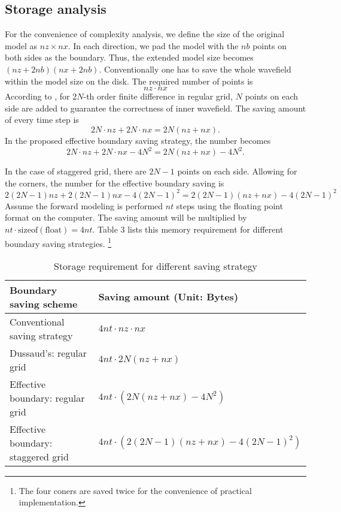\subsection{Storage analysis}

For the convenience of complexity analysis, we define the size of the original model as $nz\times nx$. In each direction, we pad the model with the $nb$ points on both sides as the boundary. Thus, the extended model size becomes $(nz+2nb)(nx+2nb)$. Conventionally one has to save the whole wavefield within the model size on the disk. The required number of points is
\begin{equation}
 nz\cdot nx
\end{equation}
According to \cite{dussaud2008computational}, for $2N$-th order finite difference in regular grid,  $N$ points on each side are added to guarantee the correctness of inner wavefield. The saving amount of every time step is
\begin{equation}
 2N\cdot nz+2N\cdot nx=2N(nz+nx).
\end{equation}
In the proposed effective boundary saving strategy, the number becomes
\begin{equation}
 2N\cdot nz+2N\cdot nx-4N^2=2N(nz+nx)-4N^2.
\end{equation}

In the case of staggered grid, there are $2N-1$ points on each side. Allowing for the corners, the number for the effective boundary saving is
\begin{equation}
2(2N-1)nz+2(2N-1)nx-4(2N-1)^2=2(2N-1)(nz+nx)-4(2N-1)^2
\end{equation}
Assume the forward modeling is performed $nt$ steps using the floating point format on the computer. The saving amount will be multiplied by $nt\cdot \mathrm{sizeof(float)}=4nt$. Table 3 lists this memory requirement for different boundary saving strategies. \footnote{The four coners are saved twice for the convenience of practical implementation.}


\begin{table*}
  \centering
  \caption{Storage requirement for different saving strategy}\label{table:3}
  \begin{tabular}{l|l}
     \hline
     Boundary saving scheme	  			&  Saving amount (Unit: Bytes)\\
     \hline
     Conventional saving strategy			&  $4 nt\cdot nz\cdot nx$ \\
     Dussaud's: regular grid				&  $4 nt\cdot2N(nz+nx) $ \\
     Effective boundary: regular grid			&  $4 nt\cdot(2N(nz+nx)-4N^2) $	\\
     Effective boundary: staggered grid			&  $4 nt\cdot(2(2N-1)(nz+nx)-4(2N-1)^2) $ \\
     \hline
   \end{tabular}
\end{table*}

